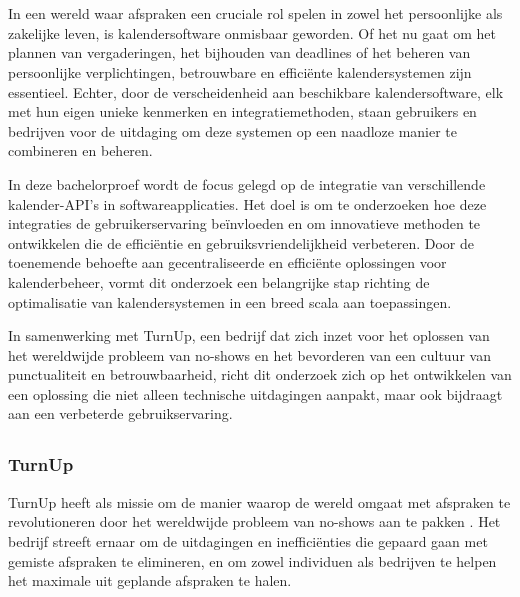 
\chapter{}%
\label{ch:inleiding}

In een wereld waar afspraken een cruciale rol spelen in zowel het persoonlijke als zakelijke leven, is kalendersoftware onmisbaar geworden. Of het nu gaat om het plannen van vergaderingen, het bijhouden van deadlines of het beheren van persoonlijke verplichtingen, betrouwbare en efficiënte kalendersystemen zijn essentieel. Echter, door de verscheidenheid aan beschikbare kalendersoftware, elk met hun eigen unieke kenmerken en integratiemethoden, staan gebruikers en bedrijven voor de uitdaging om deze systemen op een naadloze manier te combineren en beheren.

In deze bachelorproef wordt de focus gelegd op de integratie van verschillende kalender-API's in softwareapplicaties. Het doel is om te onderzoeken hoe deze integraties de gebruikerservaring beïnvloeden en om innovatieve methoden te ontwikkelen die de efficiëntie en gebruiksvriendelijkheid verbeteren. Door de toenemende behoefte aan gecentraliseerde en efficiënte oplossingen voor kalenderbeheer, vormt dit onderzoek een belangrijke stap richting de optimalisatie van kalendersystemen in een breed scala aan toepassingen.

In samenwerking met TurnUp, een bedrijf dat zich inzet voor het oplossen van het wereldwijde probleem van no-shows en het bevorderen van een cultuur van punctualiteit en betrouwbaarheid, richt dit onderzoek zich op het ontwikkelen van een oplossing die niet alleen technische uitdagingen aanpakt, maar ook bijdraagt aan een verbeterde gebruikservaring.

\section{}%
\label{sec:probleemstelling}
\subsection{TurnUp}
TurnUp heeft als missie om de manier waarop de wereld omgaat met afspraken te revolutioneren door het wereldwijde probleem van no-shows aan te pakken \autocite{TurnUp2024}. Het bedrijf streeft ernaar om de uitdagingen en inefficiënties die gepaard gaan met gemiste afspraken te elimineren, en om zowel individuen als bedrijven te helpen het maximale uit geplande afspraken te halen.


